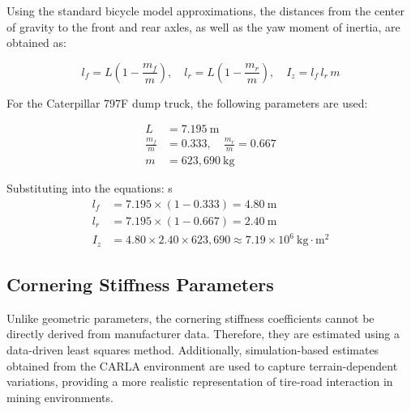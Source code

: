 \documentclass[letterpaper]{ifacconf}
\begin{document}
Using the standard bicycle model approximations, the distances from the center of gravity to the front and rear axles, as well as the yaw moment of inertia, are obtained as:

\begin{equation}
l_f = L \left( 1 - \frac{m_f}{m} \right), \quad
l_r = L \left( 1 - \frac{m_r}{m} \right), \quad
I_z = l_f \, l_r \, m
\end{equation}

For the Caterpillar 797F dump truck, the following parameters are used:

\begin{align}
L &= 7.195 \ \text{m} \\
\frac{m_f}{m} &= 0.333, \quad \frac{m_r}{m} = 0.667 \\
m &= 623{,}690 \ \text{kg}
\end{align}

Substituting into the equations:
s
\begin{align}
l_f &= 7.195 \times (1 - 0.333) = 4.80 \ \text{m} \\
l_r &= 7.195 \times (1 - 0.667) = 2.40 \ \text{m} \\
I_z &= 4.80 \times 2.40 \times 623{,}690 \approx 7.19 \times 10^{6} \ \text{kg} \cdot \text{m}^2
\end{align}

\subsection{Cornering Stiffness Parameters}

Unlike geometric parameters, the cornering stiffness coefficients cannot be directly derived from manufacturer data. Therefore, they are estimated using a data-driven least squares method. Additionally, simulation-based estimates obtained from the CARLA environment are used to capture terrain-dependent variations, providing a more realistic representation of tire-road interaction in mining environments.
\end{document}
